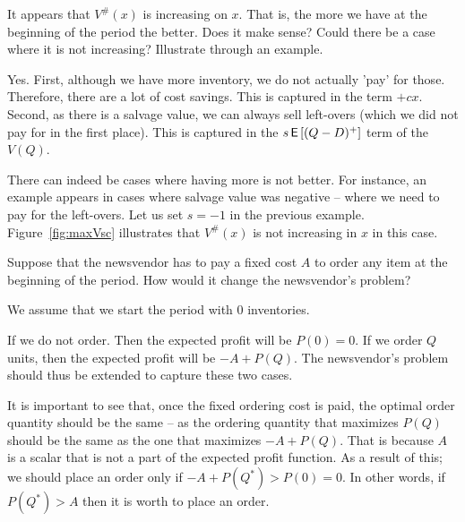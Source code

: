 \begin{exercise}
It appears that $V^\#(x)$ is increasing on $x$. That is, the more we have at the beginning of the period the better. Does it make sense? Could there be a case where it is not increasing? Illustrate through an example.


\begin{solution}
Yes. First, although we have more inventory, we do not actually 'pay' for those. Therefore, there are a lot of cost savings. This is captured in the term $+cx$. Second, as there is a salvage value, we can always sell left-overs (which we did not pay for in the first place). This is captured in the $s\,\mathsf{E}\left[(Q-D)^+\right]$ term of the $V(Q)$. 

There can indeed be cases where having more is not better. For instance, an example appears in cases where salvage value was negative -- where we need to pay for the left-overs. Let us set $s=-1$ in the previous example. Figure~\ref{fig:maxVsc} illustrates that $V^\#(x)$ is not increasing in $x$ in this case. 
\end{solution}
\end{exercise}

\begin{exercise}
Suppose that the newsvendor has to pay a fixed cost $A$ to order any item at the beginning of the period. How would it change the newsvendor's problem?


\begin{solution}
We assume that we start the period with 0 inventories. 

If we do not order. Then the expected profit will be $P(0)=0$. If we order $Q$ units, then the expected profit will be $-A+P(Q)$. The newsvendor's problem should thus be extended to capture these two cases. 

It is important to see that, once the fixed ordering cost is paid, the optimal order quantity should be the same -- as the ordering quantity that maximizes $P(Q)$ should be the same as the one that maximizes $-A+P(Q)$. That is because $A$ is a scalar that is not a part of the expected profit function. As a result of this; we should place an order only if $-A+P(Q^*)>P(0)=0$. In other words, if $P(Q^*)>A$ then it is worth to place an order. 
\end{solution}
\end{exercise}


